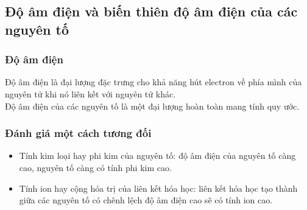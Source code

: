\subsection{Độ âm điện và biến thiên độ âm điện của các nguyên tố}
\subsubsection{Độ âm điện}
Độ âm điện là đại lượng đặc trưng cho khả năng hút electron về phía mình của nguyên tử khi nó liên kết với nguyên tử khác.\\
Độ âm điện của các nguyên tố là một đại lượng hoàn toàn mang tính quy ước.
\subsubsection{Đánh giá một cách tương đối}
\begin{itemize}
\item Tính kim loại hay phi kim của nguyên tố: độ âm điện của nguyên tố càng cao, nguyên tố càng có tính phi kim cao.
\item Tính ion hay cộng hóa trị của liên kết hóa học: liên kết hóa học tạo thành giữa các nguyên tố có chênh lệch độ âm điện cao sẽ có tính ion cao.
\end{itemize}